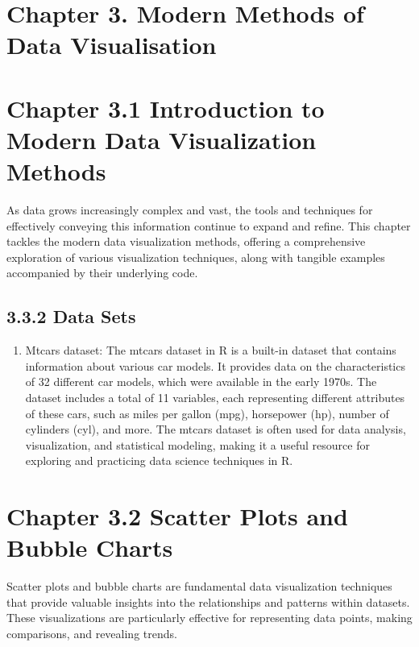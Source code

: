 \documentclass{article}\usepackage[]{graphicx}\usepackage[]{xcolor}
\begin{document}
\section{Chapter 3. Modern Methods of Data Visualisation}

\section{Chapter 3.1 Introduction to Modern Data Visualization Methods}
As data grows increasingly complex and vast, the tools and techniques for effectively conveying this information continue to expand and refine. This chapter tackles the modern data visualization methods, offering a comprehensive exploration of various visualization techniques, along with tangible examples accompanied by their underlying code.

\subsection{3.3.2 Data Sets}
\begin{enumerate}
\item Mtcars dataset: The mtcars dataset in R is a built-in dataset that contains information about various car models. It provides data on the characteristics of 32 different car models, which were available in the early 1970s. The dataset includes a total of 11 variables, each representing different attributes of these cars, such as miles per gallon (mpg), horsepower (hp), number of cylinders (cyl), and more. The mtcars dataset is often used for data analysis, visualization, and statistical modeling, making it a useful resource for exploring and practicing data science techniques in R.
\end{enumerate}

\section{Chapter 3.2 Scatter Plots and Bubble Charts}
Scatter plots and bubble charts are fundamental data visualization techniques that provide valuable insights into the relationships and patterns within datasets. These visualizations are particularly effective for representing data points, making comparisons, and revealing trends.
\end{document}
